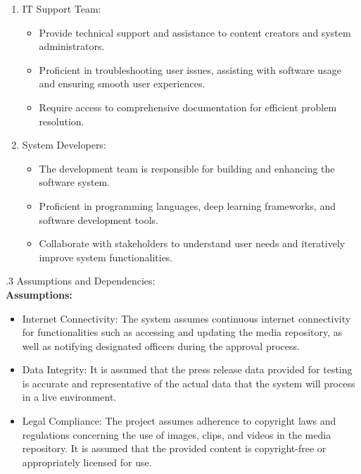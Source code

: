 \documentclass[12pt]{article}
\begin{document}
\begin{enumerate}
\item IT Support Team:
\begin{itemize}
\item Provide technical support and assistance to content creators and system administrators.
\item Proficient in troubleshooting user issues, assisting with software usage and ensuring smooth user experiences.
\item Require access to comprehensive documentation for efficient problem resolution.
\end{itemize}
\item System Developers:
\begin{itemize}
\item The development team is responsible for building and enhancing the software system.
\item Proficient in programming languages, deep learning frameworks, and software development tools.
\item Collaborate with stakeholders to understand user needs and iteratively improve system functionalities.
\end{itemize}
\end{enumerate}

.3 Assumptions and Dependencies:\\

\textbf{Assumptions:}
\begin{itemize}
\item Internet Connectivity: The system assumes continuous internet connectivity for functionalities such as accessing and updating the media repository, as well as notifying designated officers during the approval process.
\item Data Integrity: It is assumed that the press release data provided for testing is accurate and representative of the actual data that the system will process in a live environment.
\item Legal Compliance: The project assumes adherence to copyright laws and regulations concerning the use of images, clips, and videos in the media repository. It is assumed that the provided content is copyright-free or appropriately licensed for use.
\end{itemize}
\end{document}
